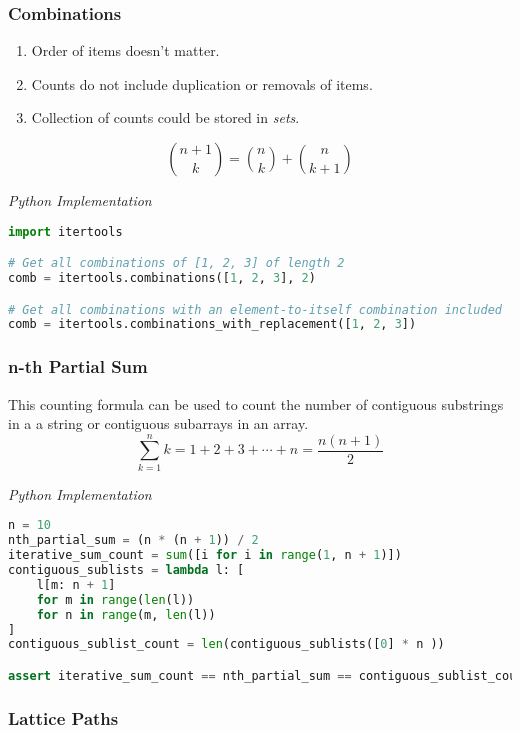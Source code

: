 \documentclass{article}
\begin{document}
    \subsubsection{Combinations}
    \begin{enumerate}
        \item Order of items doesn't matter. 
        \item Counts do not include duplication or removals of items.
        \item Collection of counts could be stored in \emph{sets}.
    \end{enumerate} 
    \[
        \binom{n+1}{k} = \binom{n}{k} + \binom{n}{k+1}
    \]

\vspace{8pt} \emph{Python Implementation}
\begin{lstlisting}[language=Python]
import itertools

# Get all combinations of [1, 2, 3] of length 2 
comb = itertools.combinations([1, 2, 3], 2)

# Get all combinations with an element-to-itself combination included 
comb = itertools.combinations_with_replacement([1, 2, 3])

\end{lstlisting}

    \subsubsection{n-th Partial Sum}
    This counting formula can be used to count the number of contiguous substrings in a a string or contiguous subarrays in an array.
    \[
        \sum_{k=1}^n k = 1 + 2 + 3 + \cdots + n = \frac{n(n+1)}{2} 
    \]
    
\vspace{8pt} \emph{Python Implementation}
\begin{lstlisting}[language=Python]
n = 10
nth_partial_sum = (n * (n + 1)) / 2 
iterative_sum_count = sum([i for i in range(1, n + 1)])
contiguous_sublists = lambda l: [
    l[m: n + 1] 
    for m in range(len(l)) 
    for n in range(m, len(l))
]
contiguous_sublist_count = len(contiguous_sublists([0] * n ))

assert iterative_sum_count == nth_partial_sum == contiguous_sublist_count
\end{lstlisting}

    \subsubsection{Lattice Paths}
\end{document}
